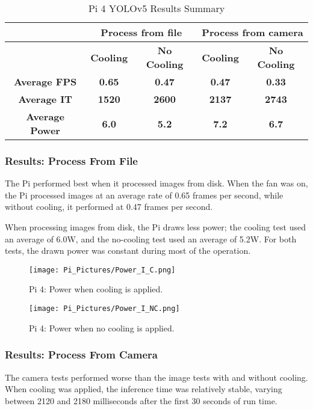 \documentclass[Report]{IEEEtran}
\begin{document}
\begin{table}[htbp]
\caption{Pi 4 YOLOv5 Results Summary}
\begin{center}
\begin{tabular}{|c|c|c|c|c|}
\hline \textbf{ }&\multicolumn{2}{|c|}{\textbf{Process from file}}&\multicolumn{2}{|c|}{\textbf{Process from camera}} \\
\hline \textbf{ }& \textbf{Cooling} & \textbf{No Cooling } & \textbf{Cooling} & \textbf{No Cooling} \\
\hline \textbf{Average FPS}& \textbf{0.65} & \textbf{0.47} & \textbf{0.47} & \textbf{0.33} \\
\hline \textbf{Average IT}& \textbf{1520} & \textbf{2600} & \textbf{2137} & \textbf{2743} \\
\hline \textbf{Average Power}& \textbf{6.0} & \textbf{5.2} & \textbf{7.2} & \textbf{6.7} \\ \hline
\end{tabular}
\label{tab1}
\end{center}
\end{table}

\subsubsection{Results: Process From File}
The Pi performed best when it processed images from disk. When the fan was on, the Pi processed images at an average rate of 0.65 frames per second, while without cooling, it performed at 0.47 frames per second.

When processing images from disk, the Pi draws less power; the cooling test used an average of 6.0W, and the no-cooling test used an average of 5.2W. For both tests, the drawn power was constant during most of the operation.

\begin{figure}[htbp]
\centerline{\texttt{[image: Pi\_Pictures/Power\_I\_C.png]}}
\caption{Pi 4: Power when cooling is applied.}
\label{fig}
\end{figure}

\begin{figure}[htbp]
\centerline{\texttt{[image: Pi\_Pictures/Power\_I\_NC.png]}}
\caption{Pi 4: Power when no cooling is applied.}
\label{fig}
\end{figure}

\subsubsection{Results: Process From Camera}
The camera tests performed worse than the image tests with and without cooling. When cooling was applied, the inference time was relatively stable, varying between 2120 and 2180 milliseconds after the first 30 seconds of run time.
\end{document}
